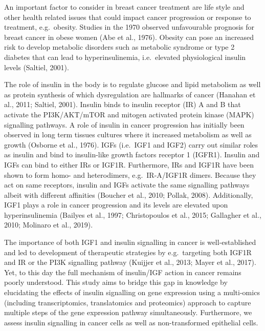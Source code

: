 \documentclass[
  12pt,
  openany]{book}
\begin{document}
An important factor to consider in breast cancer treatment are life style and other health related issues that could impact cancer progression or response to treatment, e.g.~obesity. Studies in the 1970 observed unfavourable prognosis for breast cancer in obese women (Abe et al., 1976). Obesity can pose an increased risk to develop metabolic disorders such as metabolic syndrome or type 2 diabetes that can lead to hyperinsulinemia, i.e.~elevated physiological insulin levels (Saltiel, 2001).

The role of insulin in the body is to regulate glucose and lipid metabolism as well as protein synthesis of which dysregulation are hallmarks of cancer (Hanahan et al., 2011; Saltiel, 2001). Insulin binds to insulin receptor (IR) A and B that activate the PI3K/AKT/mTOR and mitogen activated protein kinase (MAPK) signalling pathways. A role of insulin in cancer progression has initially been observed in long term tissues cultures where it increased metabolism as well as growth (Osborne et al., 1976). IGFs (i.e.~IGF1 and IGF2) carry out similar roles as insulin and bind to insulin-like growth factors receptor 1 (IGFR1). Insulin and IGFs can bind to either IRs or IGF1R. Furthermore, IRs and IGF1R have been shown to form homo- and heterodimers, e.g.~IR-A/IGF1R dimers. Because they act on same receptors, insulin and IGFs activate the same signalling pathways albeit with different affinities (Boucher et al., 2010; Pollak, 2008). Additionally, IGF1 plays a role in cancer progression and its levels are elevated upon hyperinsulinemia (Bailyes et al., 1997; Christopoulos et al., 2015; Gallagher et al., 2010; Molinaro et al., 2019).

The importance of both IGF1 and insulin signalling in cancer is well-established and led to development of therapeutic strategies by e.g.~targeting both IGF1R and IR or the PI3K signalling pathway (Kuijjer et al., 2013; Mayer et al., 2017). Yet, to this day the full mechanism of insulin/IGF action in cancer remains poorly understood. This study aims to bridge this gap in knowledge by elucidating the effects of insulin signalling on gene expression using a multi-omics (including transcriptomics, translatomics and proteomics) approach to capture multiple steps of the gene expression pathway simultaneously. Furthermore, we assess insulin signalling in cancer cells as well as non-transformed epithelial cells.
\end{document}
